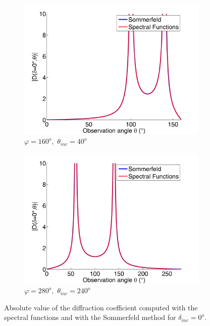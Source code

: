 \begin{figure}
\centering
\begin{subfigure}[b]{0.49\textwidth}
        \includegraphics[width=\textwidth]{images/chapter4/D_160_40_0.png}
        \caption{$\varphi=160^o,  \, \, \theta_{inc}=40^o$}
        \label{C4:compac16040}
    \end{subfigure}
\begin{subfigure}[b]{0.49\textwidth}
        \includegraphics[width=\textwidth]{images/chapter4/D_280_239_0.png}
        \caption{$\varphi=280^o, \, \, \theta_{inc}=240^o$}
        \label{C4:compac280240}
    \end{subfigure}
\caption{Absolute value of the diffraction coefficient computed with the spectral functions and with the Sommerfeld method for $\delta_{inc}=0^o$.}
\label{C4:compac}
\end{figure}

